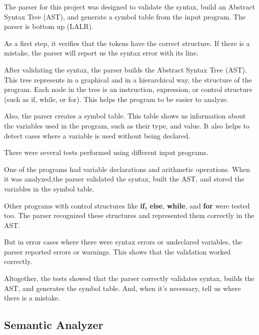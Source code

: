 \documentclass[letterpaper,12pt,oneside]{article}
\begin{document}
The parser for this project was designed to validate the syntax, build an Abstract Syntax Tree (AST), and generate a symbol table from the input program. The parser is bottom up (LALR).

\bigskip

As a first step, it verifies that the tokens have the correct structure.  If there is a mistake, the parser will report us the syntax error with its line.

\bigskip

After validating the syntax, the parser builds the Abstract Syntax Tree (AST). This tree represents in a graphical and in a hierarchical way, the structure of the program. Each node in the tree is an instruction, expression, or control structure (such as if, while, or for). This helps the program to be easier to analyze.

\bigskip

Also, the parser creates a symbol table. This table shows us information about the variables used in the program, such as their type, and value. It also helps to detect cases where a variable is used without being declared.

\bigskip

There were several tests performed using different input programs.

\bigskip

One of the programs had variable declarations and arithmetic operations. When it was analyzed,the parser validated the syntax, built the AST, and stored the variables in the symbol table.

\bigskip

Other programs with control structures like \textbf{if, else}, \textbf{while}, and \textbf{for} were tested too. The parser recognized these structures and represented them correctly in the AST.

\bigskip

But in error cases where there were syntax errors or undeclared variables, the parser reported errors or warnings. This shows that the validation worked correctly.

\bigskip

Altogether, the tests showed that the parser correctly validates syntax, builds the AST, and generates the symbol table. And, when it's necessary, tell us where there is a mistake.

\subsection{Semantic Analyzer}
\end{document}
